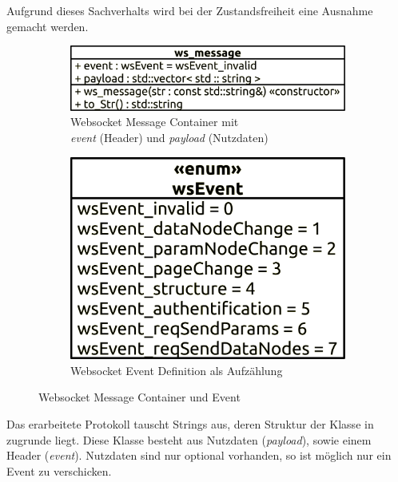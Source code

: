 Aufgrund dieses Sachverhalts wird bei der Zustandsfreiheit eine Ausnahme gemacht werden.\\
\begin{figure}[ht]
  \centering
  \begin{subfigure}[b]{0.601833561\textwidth}
    \includegraphics[width=\textwidth]{content/hauptteil/systemEntwurf/res/protokoll/ws_Message.pdf}
    \caption{Websocket Message Container mit \\ \emph{event} (Header) und \emph{payload} (Nutzdaten)}
    \label{fig:CDWME:ws_message}
  \end{subfigure}
  \hfill
  \begin{subfigure}[b]{0.388166439\textwidth}
    \includegraphics[width=\textwidth]{content/hauptteil/systemEntwurf/res/protokoll/wsEvent.pdf}
    \caption{Websocket Event Definition als Aufzählung}
    \label{fig:CDWME:wsEvent}
  \end{subfigure}
  \caption[Websocket Message Container und Event]{Websocket Message Container und Event}
  \label{fig:CDWME}
\end{figure}
Das erarbeitete Protokoll tauscht Strings aus, deren Struktur der Klasse in  zugrunde liegt.
Diese Klasse besteht aus Nutzdaten (\emph{payload}), sowie einem Header (\emph{event}).
Nutzdaten sind nur optional vorhanden, so ist möglich nur ein Event zu verschicken.
